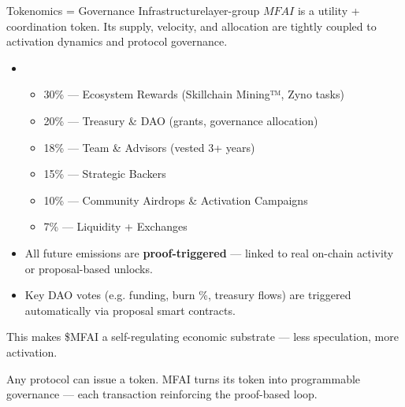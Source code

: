 \begin{mfai-box}{Tokenomics = Governance Infrastructure}{layer-group}
$MFAI$ is a utility + coordination token. Its supply, velocity, and allocation are tightly coupled to activation dynamics and protocol governance.
\end{mfai-box}

\vspace{1em}

\begin{itemize}
  \item {}
    \begin{itemize}
      \item 30\% — Ecosystem Rewards (Skillchain Mining™, Zyno tasks)
      \item 20\% — Treasury \& DAO (grants, governance allocation)
      \item 18\% — Team \& Advisors (vested 3+ years)
      \item 15\% — Strategic Backers
      \item 10\% — Community Airdrops \& Activation Campaigns
      \item 7\% — Liquidity + Exchanges
    \end{itemize}
  \item {} All future emissions are \textbf{proof-triggered} — linked to real on-chain activity or proposal-based unlocks.
  \item {} Key DAO votes (e.g. funding, burn \%, treasury flows) are triggered automatically via proposal smart contracts.
\end{itemize}

\vspace{1em}
\begin{mfai-note}
This makes \$MFAI a self-regulating economic substrate — less speculation, more activation.
\end{mfai-note}

\vspace{2em}

\begin{center}
\end{center}

\vspace{2em}

\begin{mfai-warning}
Any protocol can issue a token. MFAI turns its token into programmable governance — each transaction reinforcing the proof-based loop.
\end{mfai-warning}

